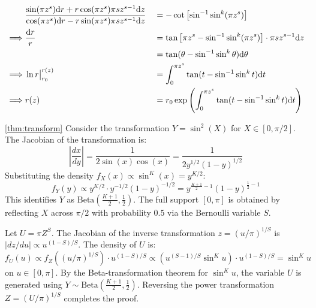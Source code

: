 \begin{rmk}
\begin{align*}
    &\frac{\sin(\pi z^s) \mathrm d r + r \cos(\pi z^s) \pi s z^{s-1} \mathrm d z}{\cos (\pi z^s) \mathrm d r - r \sin(\pi z^s) \pi s z^{s-1} \mathrm d z} &&= - \cot \left[ \sin^{-1} \sin^k(\pi z^s) \right] \\
    \implies& \frac{\mathrm d r}{r} &&= \tan\left[ \pi z^s - \sin^{-1}\sin^k(\pi z^s) \right] \cdot \pi s z^{s-1} \mathrm d z\\
    & &&= \tan ( \theta - \sin^{-1}\sin^k \theta ) \mathrm d \theta\\
    \implies& \ln r \big|_{r_0}^{r(z)} &&= \int_0^{\pi z^s} \tan(t - \sin^{-1}\sin^k t) \mathrm d t\\
    \implies& r(z) &&= r_0 \exp\left(\int_0^{\pi z^s} \tan(t - \sin^{-1}\sin^k t) \mathrm d t\right)
\end{align*}
\end{rmk}


    \begin{proofof}{\autoref{thm:transform}}
Consider the transformation $Y = \sin^2(X)$ for $X \in [0, \pi/2]$. The Jacobian of the transformation is:
\begin{equation}
\left| \frac{dx}{dy} \right| = \frac{1}{2\sin(x)\cos(x)} = \frac{1}{2y^{1/2}(1-y)^{1/2}}
\end{equation}
Substituting the density $f_X(x) \propto \sin^K(x) = y^{K/2}$:
\begin{equation}
f_Y(y) \propto y^{K/2} \cdot y^{-1/2}(1-y)^{-1/2} = y^{\frac{K+1}{2} - 1}(1-y)^{\frac{1}{2} - 1}
\end{equation}
This identifies $Y$ as $\text{Beta}\left(\frac{K+1}{2}, \frac{1}{2}\right)$. The full support $[0, \pi]$ is obtained by reflecting $X$ across $\pi/2$ with probability $0.5$ via the Bernoulli variable $S$.

Let $U = \pi Z^S$. The Jacobian of the inverse transformation $z = (u/\pi)^{1/S}$ is $|dz/du| \propto u^{(1-S)/S}$. The density of $U$ is:
\begin{equation}
f_U(u) \propto f_Z((u/\pi)^{1/S}) \cdot u^{(1-S)/S} \propto (u^{(S-1)/S} \sin^K u) \cdot u^{(1-S)/S} = \sin^K u
\end{equation}
on $u \in [0, \pi]$. By the Beta-transformation theorem for $\sin^K u$, the variable $U$ is generated using $Y \sim \text{Beta}(\frac{K+1}{2}, \frac{1}{2})$. Reversing the power transformation $Z = (U/\pi)^{1/S}$ completes the proof.
\end{proofof}



